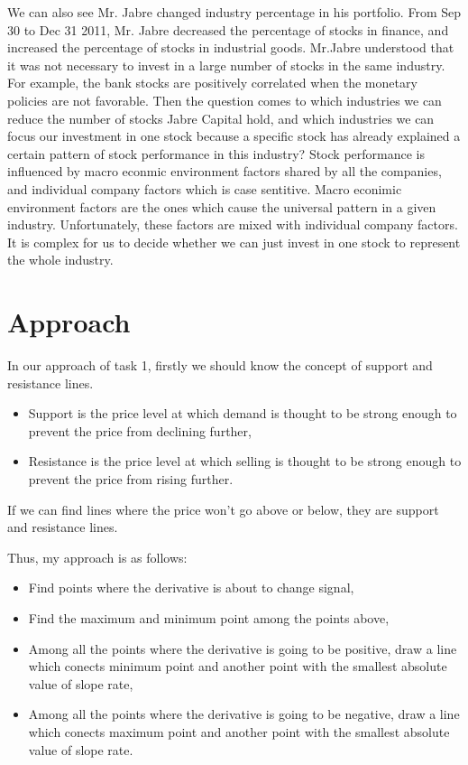 \documentclass[12pt,letterpaper]{article}
\theoremstyle{definition}
\begin{document}
We can also see Mr. Jabre changed industry percentage in his portfolio. From Sep 30 to Dec 31 2011, Mr. Jabre decreased the percentage of stocks in finance, and increased the percentage of stocks in industrial goods. Mr.Jabre understood that it was not necessary to invest in a large number of stocks in the same industry. For example, the bank stocks are positively correlated when the monetary policies are not favorable. Then the question comes to which industries we can reduce the number of stocks Jabre Capital hold, and which industries we can focus our investment in one stock because a specific stock has already explained a certain pattern of stock performance in this industry? Stock performance is influenced by macro econmic environment factors shared by all the companies, and individual company factors which is case sentitive. Macro econimic environment factors are the ones which cause the universal pattern in a given industry. Unfortunately, these factors are mixed with individual company factors. It is complex for us to decide whether we can just invest in one stock to represent the whole industry.

 \section{Approach}
In our approach of task 1, firstly we should know the concept of support and resistance lines. 
\begin{itemize}
\item Support is the price level at which demand is thought to be strong enough to prevent the price from declining further, 
\item Resistance is the price level at which selling is thought to be strong enough to prevent the price from rising further.
\end{itemize}
If we can find lines where the price won't go above or below, they are support and resistance lines.

Thus, my approach is as follows:
\begin{itemize}
\item Find points where the  derivative is about to change signal,
\item Find the maximum and minimum point among the points above,
\item Among all the points where the derivative is going to be positive, draw a line which conects minimum point and another point with the smallest absolute value of slope rate,
\item Among all the points where the derivative is going to be negative, draw a line which conects maximum point and another point with the smallest absolute value of slope rate.
\end{itemize}
\end{document}
